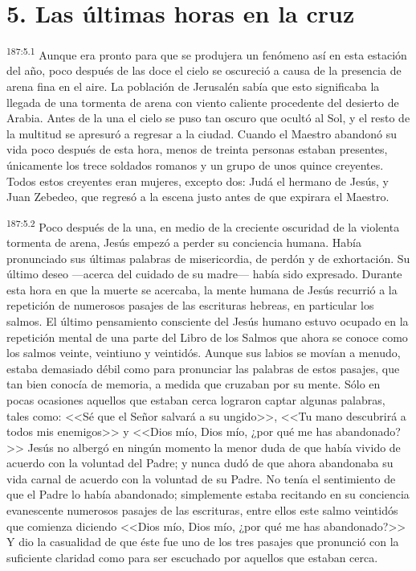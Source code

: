 \section*{5. Las últimas horas en la cruz}
\par 
\textsuperscript{187:5.1} Aunque era pronto para que se produjera un fenómeno así en esta estación del año, poco después de las doce el cielo se oscureció a causa de la presencia de arena fina en el aire. La población de Jerusalén sabía que esto significaba la llegada de una tormenta de arena con viento caliente procedente del desierto de Arabia. Antes de la una el cielo se puso tan oscuro que ocultó al Sol, y el resto de la multitud se apresuró a regresar a la ciudad. Cuando el Maestro abandonó su vida poco después de esta hora, menos de treinta personas estaban presentes, únicamente los trece soldados romanos y un grupo de unos quince creyentes. Todos estos creyentes eran mujeres, excepto dos: Judá el hermano de Jesús, y Juan Zebedeo, que regresó a la escena justo antes de que expirara el Maestro.

\par 
\textsuperscript{187:5.2} Poco después de la una, en medio de la creciente oscuridad de la violenta tormenta de arena, Jesús empezó a perder su conciencia humana. Había pronunciado sus últimas palabras de misericordia, de perdón y de exhortación. Su último deseo ---acerca del cuidado de su madre--- había sido expresado. Durante esta hora en que la muerte se acercaba, la mente humana de Jesús recurrió a la repetición de numerosos pasajes de las escrituras hebreas, en particular los salmos. El último pensamiento consciente del Jesús humano estuvo ocupado en la repetición mental de una parte del Libro de los Salmos que ahora se conoce como los salmos veinte, veintiuno y veintidós. Aunque sus labios se movían a menudo, estaba demasiado débil como para pronunciar las palabras de estos pasajes, que tan bien conocía de memoria, a medida que cruzaban por su mente. Sólo en pocas ocasiones aquellos que estaban cerca lograron captar algunas palabras, tales como: <<Sé que el Señor salvará a su ungido>>, <<Tu mano descubrirá a todos mis enemigos>> y <<Dios mío, Dios mío, ¿por qué me has abandonado?>> Jesús no albergó en ningún momento la menor duda de que había vivido de acuerdo con la voluntad del Padre; y nunca dudó de que ahora abandonaba su vida carnal de acuerdo con la voluntad de su Padre. No tenía el sentimiento de que el Padre lo había abandonado; simplemente estaba recitando en su conciencia evanescente numerosos pasajes de las escrituras, entre ellos este salmo veintidós que comienza diciendo <<Dios mío, Dios mío, ¿por qué me has abandonado?>> Y dio la casualidad de que éste fue uno de los tres pasajes que pronunció con la suficiente claridad como para ser escuchado por aquellos que estaban cerca.

